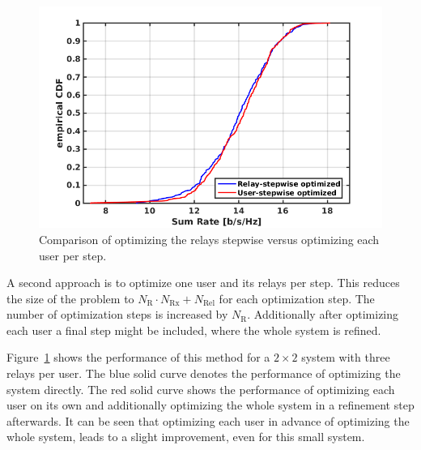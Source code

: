 \begin{figure}[h]
\centering
  \includegraphics[width=0.8\linewidth]{images/stepwise_comparison.png}
\caption{Comparison of optimizing the relays stepwise versus optimizing each user per step.}
\label{fig:uservsrelay_stepwise}
\end{figure}
A second approach is to optimize one user and its relays per step.
This reduces the size of the problem to $N_\text{R}\cdot N_\text{Rx}+N_\text{Rel}$ for each optimization step.
The number of optimization steps is increased by $N_\text{R}$.
Additionally after optimizing each user a final step might be included, where the whole system is refined.

Figure~\ref{fig:uservsrelay_stepwise} shows the performance of this method for a $2\times2$ system with three relays per user.
The blue solid curve denotes the performance of optimizing the system directly.
The red solid curve shows the performance of optimizing each user on its own and additionally optimizing the whole system in a refinement step afterwards.
It can be seen that optimizing each user in advance of optimizing the whole system, leads to a slight improvement, even for this small system.





